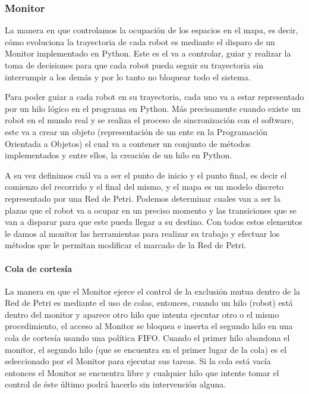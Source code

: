 \subsubsection{Monitor}

La manera en que controlamos la ocupación de los espacios en el mapa, es decir, cómo evoluciona la trayectoria de cada robot es mediante el disparo de un Monitor implementado en Python. Este es el va a controlar, guiar y realizar la toma de decisiones para que cada robot pueda seguir su trayectoria sin interrumpir a los demás y por lo tanto no bloquear todo el sistema.

Para poder guiar a cada robot en su trayectoria, cada uno va a estar representado por un hilo lógico en el programa en Python. Más precisamente cuando existe un robot en el mundo real y se realiza el proceso de sincronización con el software, este va a crear un objeto (representación de un ente en la Programación Orientada a Objetos) el cual va a contener un conjunto de métodos implementados y entre ellos, la creación de un hilo en Python.

A su vez definimos cuál va a ser el punto de inicio y el punto final, es decir el comienzo del recorrido y el final del mismo, y el mapa es un modelo discreto representado por una Red de Petri. Podemos determinar cuales van a ser la plazas que el robot va a ocupar en un preciso momento y las transiciones que se van a disparar para que este pueda llegar a su destino. Con todos estos elementos le damos al monitor las herramientas para realizar su trabajo y efectuar los métodos que le permitan modificar el marcado de la Red de Petri.

\paragraph{Cola de cortesía} \mbox{} \vspace{8pt}

La manera en que el Monitor ejerce el control de la exclusión mutua dentro de la Red de Petri es mediante el uso de colas, entonces, cuando un hilo (robot) está dentro del monitor y aparece otro hilo que intenta ejecutar otro o el mismo procedimiento, el acceso al Monitor se bloquea e inserta el segundo hilo en una cola de cortesía usando una política FIFO. Cuando el primer hilo abandona el monitor, el segundo hilo (que se encuentra en el primer lugar de la cola) es el seleccionado por el Monitor para ejecutar sus tareas. Si la cola está vacía entonces el Monitor se encuentra libre y cualquier hilo que intente tomar el control de éste último podrá hacerlo sin intervención alguna.

